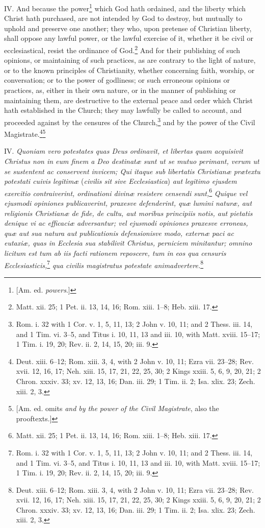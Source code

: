 IV. And because the power\footnote{[Am. ed. \emph{powers}.]} which God hath ordained, and the liberty which Christ hath purchased, are not intended by God to destroy, but mutually to uphold and preserve one another; they who, upon pretense of Christian liberty, shall oppose any lawful power, or the lawful exercise of it, whether it be civil or ecclesiastical, resist the ordinance of God.\footnote{Matt. xii. 25; 1 Pet. ii. 13, 14, 16; Rom. xiii. 1–8; Heb. xiii. 17.} And for their publishing of such opinions, or maintaining of such practices, as are contrary to the light of nature, or to the known principles of Christianity, whether concerning faith, worship, or conversation; or to the power of godliness; or such erroneous opinions or practices, as, either in their own nature, or in the manner of publishing or maintaining them, are destructive to the external peace and order which Christ hath established in the Church; they may lawfully be called to account, and proceeded against by the censures of the Church,\footnote{Rom. i. 32 with 1 Cor. v. 1, 5, 11, 13; 2 John v. 10, 11; and 2 Thess. iii. 14, and 1 Tim. vi. 3–5, and Titus i. 10, 11, 13 and iii. 10, with Matt. xviii. 15–17; 1 Tim. i. 19, 20; Rev. ii. 2, 14, 15, 20; iii. 9.} and by the power of the Civil Magistrate.\footnote{Deut. xiii. 6–12; Rom. xiii. 3, 4, with 2 John v. 10, 11; Ezra vii. 23–28; Rev. xvii. 12, 16, 17; Neh. xiii. 15, 17, 21, 22, 25, 30; 2 Kings xxiii. 5, 6, 9, 20, 21; 2 Chron. xxxiv. 33; xv. 12, 13, 16; Dan. iii. 29; 1 Tim. ii. 2; Isa. xlix. 23; Zech. xiii. 2, 3.}\footnote{[Am. ed. omits \emph{and by the power of the Civil Magistrate}, also the prooftexts.]}

IV. \emph{Quoniam vero potestates quas Deus ordinavit, et libertas quam acquisivit Christus non in eum finem a Deo destinatæ sunt ut se mutuo perimant, verum ut se sustentent ac conservent invicem; Qui itaque sub libertatis Christianæ prætextu potestati cuivis legitimæ }(\emph{civilis sit sive Ecclesiastica}) \emph{aut legitimo ejusdem exercitio contraiverint, ordinationi divinæ resistere censendi sunt,}\footnote{Matt. xii. 25; 1 Pet. ii. 13, 14, 16; Rom. xiii. 1–8; Heb. xiii. 17.}\emph{ Quique vel ejusmodi opiniones publicaverint, praxesve defenderint, quæ lumini naturæ, aut religionis Christianæ de fide, de cultu, aut moribus principiis notis, aut pietatis denique vi ac efficaciæ adversantur; vel ejusmodi opiniones praxesve erroneas, quæ aut sua natura aut publicationis defensionisve modo, externæ paci ac eutaxiæ, quas in Ecclesia sua stabilivit Christus, perniciem minitantur; omnino licitum est tum ab iis facti rationem reposcere, tum in eos qua censuris Ecclesiasticis,}\footnote{Rom. i. 32 with 1 Cor. v. 1, 5, 11, 13; 2 John v. 10, 11; and 2 Thess. iii. 14, and 1 Tim. vi. 3–5, and Titus i. 10, 11, 13 and iii. 10, with Matt. xviii. 15–17; 1 Tim. i. 19, 20; Rev. ii. 2, 14, 15, 20; iii. 9.}\emph{ qua civilis magistratus potestate animadvertere.}\footnote{Deut. xiii. 6–12; Rom. xiii. 3, 4, with 2 John v. 10, 11; Ezra vii. 23–28; Rev. xvii. 12, 16, 17; Neh. xiii. 15, 17, 21, 22, 25, 30; 2 Kings xxiii. 5, 6, 9, 20, 21; 2 Chron. xxxiv. 33; xv. 12, 13, 16; Dan. iii. 29; 1 Tim. ii. 2; Isa. xlix. 23; Zech. xiii. 2, 3.}

